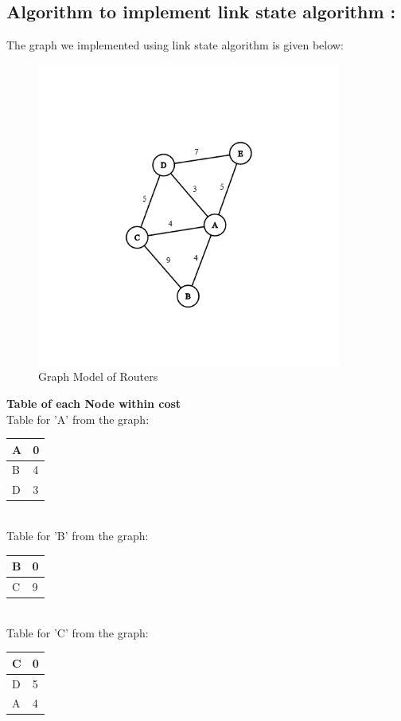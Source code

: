 \documentclass[11pt]{article}
\begin{document}
\subsection{Algorithm to implement link state algorithm : }
The graph we implemented using link state algorithm is given below:
 \begin{figure}[!h]
\centering
\includegraphics[width=\textwidth,height=10cm,keepaspectratio]{graph.png}
\caption{Graph Model of Routers}
\end{figure}
\FloatBarrier

\textbf{Table of each Node within cost}\\[24pt]

Table for 'A' from the graph:\\[12pt] 
\begin{tabular}{ | m{8em} | m{5cm}| } 
  \hline
   A & 0\\ 
  \hline
  B & 4\\ 
  \hline
  D & 3\\ 
  \hline
\end{tabular}\\[24pt]


Table for 'B' from the graph:\\[12pt] 
\begin{tabular}{ | m{8em} | m{5cm}| } 
  \hline
   B & 0\\ 
  \hline
  C & 9\\ 
  \hline
\end{tabular}\\[24pt]


Table for 'C' from the graph:\\[12pt] 
\begin{tabular}{ | m{8em} | m{5cm}| } 
  \hline
   C & 0\\ 
  \hline
  D & 5\\ 
  \hline
  A & 4\\ 
  \hline
\end{tabular}\\[24pt]
\end{document}
